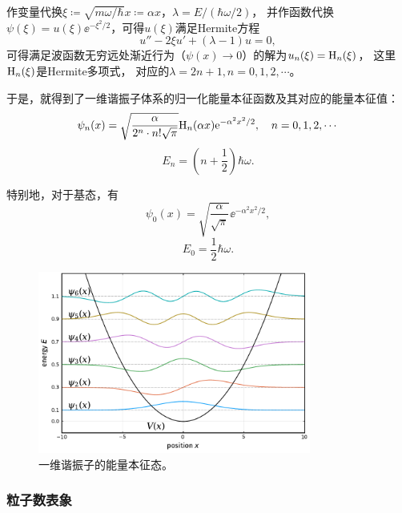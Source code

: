 作变量代换$\xi\coloneq \sqrt{m\omega/\hbar} x \coloneq \alpha x$，$\lambda = E/(\hbar\omega/2)$，
并作函数代换$\psi(\xi)=u(\xi)\ee^{-\xi^2/2}$，可得$u(\xi)$满足Hermite方程
\begin{equation}
    u''-2\xi u'+(\lambda-1)u = 0,
\end{equation}
可得满足波函数无穷远处渐近行为（$\psi(x)\rightarrow 0$）的解为$u_n(\xi) = \rm{H}_n(\xi)$，
这里$\rm{H}_n(\xi)$是Hermite多项式，
对应的$\lambda=2n+1, n=0,1,2,\cdots$。

于是，就得到了一维谐振子体系的归一化能量本征函数及其对应的能量本征值：
\begin{equation}
    \label{eq:onedim_osc_coord_wfn}
    \psi_n(x) = \sqrt{\frac{\alpha}{2^n\cdot n! \sqrt{\pi}}} \rm{H}_n(\alpha x) \ee^{-\alpha^2 x^2/2}, \quad n=0,1,2,\cdots
\end{equation}
\begin{equation}
    E_n = \left(n+\frac12\right) \hbar\omega.
\end{equation}

特别地，对于基态，有
\begin{equation}
    \psi_0(x) = \sqrt{\frac{\alpha}{\sqrt{\pi}}} \ee^{-\alpha^2 x^2/2},
\end{equation}
\begin{equation}
    E_0 = \frac12 \hbar\omega.
\end{equation}

\begin{figure}[ht]
    \centering
    \includegraphics[width=0.8\textwidth]{figures/sec3_figures/harmonic_oscillator_eigenstates.pdf}
    \caption{一维谐振子的能量本征态。}
\end{figure}


\subsubsection{粒子数表象}


